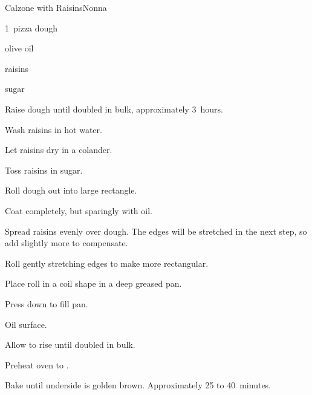 \begin{recipe}{Calzone with Raisins}{Nonna}{}

\begin{ingredients}
\item 1~pizza dough
\item olive oil
\item {} raisins
\item {} sugar
\end{ingredients}

\begin{directions}
\item Raise dough until doubled in bulk, approximately 3~hours.
\item Wash raisins in hot water.
\item Let raisins dry in a colander.
\item Toss raisins in sugar.
\item Roll dough out into large rectangle.
\item Coat completely, but sparingly with oil.
\item Spread raisins evenly over dough. The edges will be stretched in the next step, so add slightly more to compensate.
\item Roll gently stretching edges to make more rectangular.
\item Place roll in a coil shape in a deep greased pan.
\item Press down to fill pan.
\item Oil surface.
\item Allow to rise until doubled in bulk.
\item Preheat oven to .
\item Bake until underside is golden brown. Approximately 25 to 40~minutes.
\end{directions}

\end{recipe}
